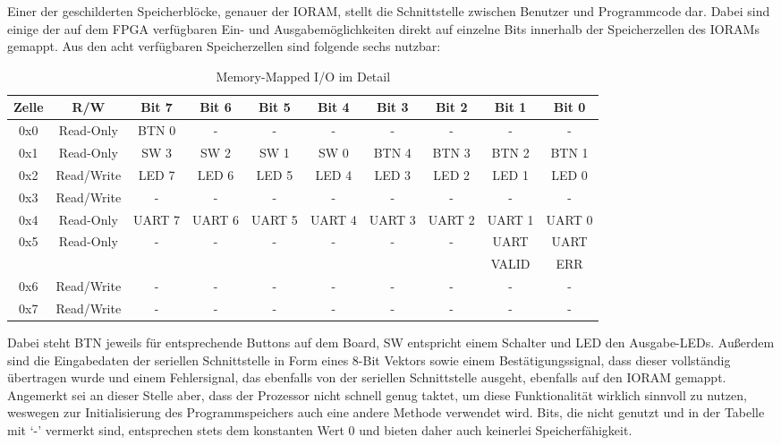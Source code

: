 \label{sec:mmuio}
Einer der geschilderten Speicherbl\"ocke, genauer der IORAM, stellt die Schnittstelle zwischen Benutzer und Programmcode dar. Dabei sind einige der auf dem FPGA verf\"ugbaren Ein- und Ausgabem\"oglichkeiten direkt auf einzelne Bits innerhalb der Speicherzellen des IORAMs gemappt. Aus den acht verf\"ugbaren Speicherzellen sind folgende sechs nutzbar:

\begin{table}[H]
\begin{center}
	\begin{tabular}{| c | c | c | c | c | c | c | c | c | c |}
	\hline
	Zelle & R/W & Bit 7 & Bit 6 & Bit 5 & Bit 4 & Bit 3 & Bit 2 & Bit 1 & Bit 0 \\ \hline
	0x0 & Read-Only & BTN 0 & - & - & - & - & - & - & - \\ \hline
	0x1 & Read-Only & SW 3 & SW 2 & SW 1 & SW 0 & BTN 4 & BTN 3 & BTN 2 & BTN 1 \\ \hline
	0x2 & Read/Write & LED 7 & LED 6 & LED 5 & LED 4 & LED 3 & LED 2 & LED 1 & LED 0 \\ \hline
	0x3 & Read/Write & - & - & - & - & - & - & - & - \\ \hline
	0x4 & Read-Only & UART 7 & UART 6 & UART 5 & UART 4 & UART 3 & UART 2 & UART 1 & UART 0 \\ \hline
	0x5 & Read-Only & - & - & - & - & - & - & UART & UART \\
	 &  &   &   &   &   &   &   & VALID & ERR \\ \hline
	0x6 & Read/Write & - & - & - & - & - & - & - & - \\ \hline
	0x7 & Read/Write & - & - & - & - & - & - & - & - \\ \hline
	\end{tabular}
\end{center}
\caption{Memory-Mapped I/O im Detail}
\end{table}

Dabei steht BTN jeweils f\"ur entsprechende Buttons auf dem Board, SW entspricht einem Schalter und LED den Ausgabe-LEDs. Au\ss{}erdem sind die Eingabedaten der seriellen Schnittstelle in Form eines 8-Bit Vektors sowie einem Best\"atigungssignal, dass dieser vollst\"andig \"ubertragen wurde und einem Fehlersignal, das ebenfalls von der seriellen Schnittstelle ausgeht, ebenfalls auf den IORAM gemappt. Angemerkt sei an dieser Stelle aber, dass der Prozessor nicht schnell genug taktet, um diese Funktionalit\"at wirklich sinnvoll zu nutzen, weswegen zur Initialisierung des Programmspeichers auch eine andere Methode verwendet wird. Bits, die nicht genutzt und in der Tabelle mit `-' vermerkt sind, entsprechen stets dem konstanten Wert 0 und bieten daher auch keinerlei Speicherf\"ahigkeit.

